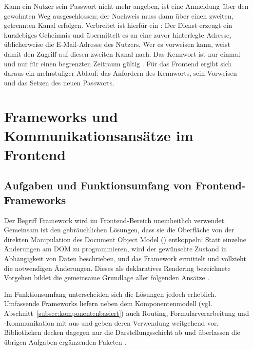 Kann ein Nutzer sein Passwort nicht mehr angeben, ist eine Anmeldung
über den gewohnten Weg ausgeschlossen; der Nachweis muss dann über
einen zweiten, getrennten Kanal erfolgen. Verbreitet ist hierfür ein
: Der Dienst erzeugt ein kurzlebiges Geheimnis und
übermittelt es an eine zuvor hinterlegte Adresse, üblicherweise die
E-Mail-Adresse des Nutzers. Wer es vorweisen kann, weist damit den
Zugriff auf diesen zweiten Kanal nach. Das Kennwort ist nur einmal
und nur für einen begrenzten Zeitraum gültig
\cite{nist_digital_identity}. Für das Frontend ergibt sich daraus ein mehrstufiger Ablauf: das Anfordern des Kennworts, sein Vorweisen und das Setzen des neuen
Passworts.

\section{Frameworks und Kommunikationsansätze im Frontend}
\label{sec:technologiestack}

\subsection{Aufgaben und Funktionsumfang von Frontend-Frameworks}
\label{subsec:framework-funktionen}

Der Begriff Framework wird im Frontend-Bereich uneinheitlich
verwendet. Gemeinsam ist den gebräuchlichen Lösungen, dass sie die
Oberfläche von der direkten Manipulation des Document Object Model
() entkoppeln: Statt einzelne Änderungen am \acs{DOM}
zu programmieren, wird der gewünschte Zustand in Abhängigkeit von
Daten beschrieben, und das Framework ermittelt und vollzieht die
notwendigen Änderungen. Dieses als deklaratives Rendering
bezeichnete Vorgehen bildet die gemeinsame Grundlage aller folgenden
Ansätze \cite{comparative_spa_frameworks}.

Im Funktionsumfang unterscheiden sich die Lösungen jedoch erheblich.
Umfassende Frameworks liefern neben dem Komponentenmodell (vgl.
Abschnitt~\ref{subsec:komponentenbasiert}) auch Routing,
Formularverarbeitung und -Kommunikation mit aus und
geben deren Verwendung weitgehend vor. Bibliotheken decken dagegen
nur die Darstellungsschicht ab und überlassen die übrigen Aufgaben
ergänzenden Paketen \cite{comparative_spa_frameworks}.

